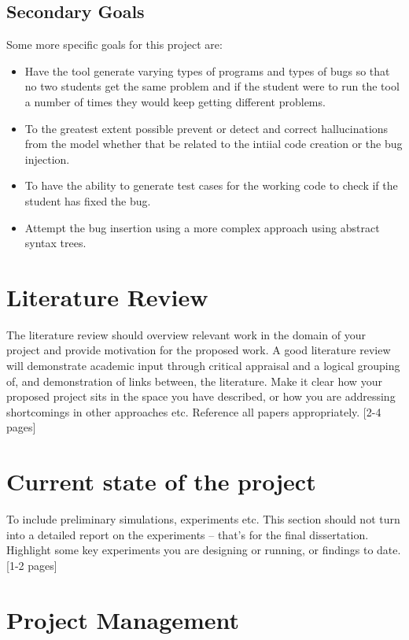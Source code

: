 \documentclass[12pt]{extarticle}
\begin{document}
\subsection{Secondary Goals}

Some more specific goals for this project are:
\begin{itemize}
    \item Have the tool generate varying types of programs and types of bugs so that no two students get the same problem and if the student were to run the tool a number of times they would keep getting different problems.
    \item To the greatest extent possible prevent or detect and correct hallucinations from the model whether that be related to the intiial code creation or the bug injection.
    \item To have the ability to generate test cases for the working code to check if the student has fixed the bug.
    \item Attempt the bug insertion using a more complex approach using abstract syntax trees.
\end{itemize}

\section{Literature Review}

The literature review should overview relevant work in the domain of your project and provide motivation for the proposed work. A good literature review will demonstrate academic input through critical appraisal and a logical grouping of, and demonstration of links between, the literature. Make it clear how your proposed project sits in the space you have described, or how you are addressing shortcomings in other approaches etc. Reference all papers appropriately. [2-4 pages] 

\section{Current state of the project}

To include preliminary simulations, experiments etc. This section should not turn into a detailed report on the experiments – that’s for the final dissertation. Highlight some key experiments you are designing or running, or findings to date. [1-2 pages]   

\section{Project Management}
\end{document}
